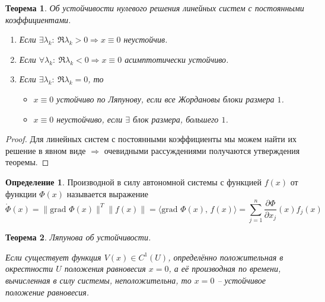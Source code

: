\documentclass[a4paper,12pt]{article}
\theoremstyle{plain}
\newtheorem{theorem}{Теорема}[section]
\theoremstyle{definition}
\newtheorem{definition}{Определение}[section]
\theoremstyle{remark}
\begin{document}
\begin{theorem}
	Об устойчивости нулевого решения линейных систем с постоянными коэффициентами.

	\begin{enumerate}
		\item Если $\exists \lambda_k:\: \Re \lambda_k > 0 \Rightarrow x \equiv 0$ неустойчив.
		\item Если $\forall \lambda_k:\: \Re \lambda_k < 0 \Rightarrow x \equiv 0$ асимптотически устойчиво.
		\item Если $\exists \lambda_k:\: \Re \lambda_k = 0$, то
		      \begin{itemize}
			      \item $x \equiv 0$ устойчиво по Ляпунову, если все Жордановы блоки размера $1$.
			      \item $x \equiv 0$ неустойчиво, если $\exists$ блок размера, большего $1$.
		      \end{itemize}
	\end{enumerate}
\end{theorem}

\begin{proof}
	Для линейных систем с постоянными коэффициенты мы можем найти их решение в явном виде $\Rightarrow$ очевидными рассуждениями получаются утверждения теоремы.
\end{proof}

\begin{definition}
	Производной в силу автономной системы с функцией $f(x)$ от функции $\Phi(x)$ называется выражение
	\[\mathring{\Phi}(x) = \|\text{grad }\Phi(x)\|^T\|f(x)\| = \langle\text{grad }\Phi(x),\, f(x)\rangle = \sum_{j = 1}^n \frac{\partial \Phi}{\partial x_j}(x)f_j(x)\]
\end{definition}

\begin{theorem}
	Ляпунова об устойчивости.

	Если существует функция $V(x)  \in C^1(U)$, определённо положительная в окрестности $U$ положения равновесия $x = 0$, а её производная по времени, вычисленная в силу системы, неположительна, то $x = 0$ -- устойчивое положение равновесия.
\end{theorem}
\end{document}
